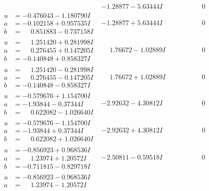 \documentclass[1p]{elsarticle_modified}
\theoremstyle{definition}
\begin{document}
$$\begin{array}{c|c|c}
 & -1.28877 - 5.63444 I & \phantom{-0.000000 } 0 \\ \hline\begin{aligned}
u &= -0.476043 - 1.180790 I \\
a &= -0.102158 + 0.957535 I \\
b &= \phantom{-}0.851883 - 0.737158 I\end{aligned}
 & -1.28877 + 5.63444 I & \phantom{-0.000000 } 0 \\ \hline\begin{aligned}
u &= \phantom{-}1.251420 + 0.281998 I \\
a &= \phantom{-}0.276455 + 0.147205 I \\
b &= -0.140848 + 0.858327 I\end{aligned}
 & \phantom{-}1.76672 - 1.02889 I & \phantom{-0.000000 } 0 \\ \hline\begin{aligned}
u &= \phantom{-}1.251420 - 0.281998 I \\
a &= \phantom{-}0.276455 - 0.147205 I \\
b &= -0.140848 - 0.858327 I\end{aligned}
 & \phantom{-}1.76672 + 1.02889 I & \phantom{-0.000000 } 0 \\ \hline\begin{aligned}
u &= -0.579676 + 1.154700 I \\
a &= -1.93844 - 0.37344 I \\
b &= \phantom{-}0.622082 - 1.026640 I\end{aligned}
 & -2.92632 - 4.30812 I & \phantom{-0.000000 } 0 \\ \hline\begin{aligned}
u &= -0.579676 - 1.154700 I \\
a &= -1.93844 + 0.37344 I \\
b &= \phantom{-}0.622082 + 1.026640 I\end{aligned}
 & -2.92632 + 4.30812 I & \phantom{-0.000000 } 0 \\ \hline\begin{aligned}
u &= -0.856923 + 0.968536 I \\
a &= \phantom{-}1.23974 + 1.20572 I \\
b &= -0.711815 - 0.829718 I\end{aligned}
 & -2.50811 - 0.59518 I & \phantom{-0.000000 } 0 \\ \hline\begin{aligned}
u &= -0.856923 - 0.968536 I \\
a &= \phantom{-}1.23974 - 1.20572 I \\

\end{aligned}
\end{array}$$
\end{document}

